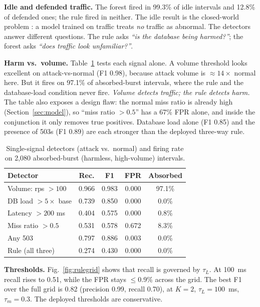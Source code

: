 \documentclass[journal]{IEEEtran}
\begin{document}
\textbf{Idle and defended traffic.} The forest fired in 99.3\% of idle intervals and
12.8\% of defended ones; the rule fired in neither. The idle result is the closed-world
problem \cite{sommer2010}: a model trained on traffic treats \emph{no} traffic as
abnormal. The detectors answer different questions. The rule asks \emph{``is the
database being harmed?''}; the forest asks \emph{``does traffic look unfamiliar?''}.

\textbf{Harm vs.\ volume.} Table~\ref{tab:single} tests each signal alone. A volume
threshold looks excellent on attack-vs-normal (F1 0.98), because attack volume is
${\approx}14\times$ normal here. But it fires on 97.1\% of absorbed-burst intervals,
where the rule and the database-load condition never fire. \emph{Volume detects
traffic; the rule detects harm.} The table also exposes a design flaw: the normal miss
ratio is already high (Section~\ref{sec:model}), so ``miss ratio $>0.5$'' has a 67\%
FPR alone, and inside the conjunction it only removes true positives. Database load
alone (F1 0.85) and the presence of 503s (F1 0.89) are each stronger than the deployed
three-way rule.

\begin{table}[t]
\centering
\caption{Single-signal detectors (attack vs.\ normal) and firing rate on 2{,}080
absorbed-burst (harmless, high-volume) intervals.}
\label{tab:single}
\footnotesize
\setlength{\tabcolsep}{3pt}
\begin{tabular}{@{}lcccc@{}}
\toprule
Detector & Rec. & F1 & FPR & Absorbed \\
\midrule
Volume: rps $>100$ & 0.966 & 0.983 & 0.000 & 97.1\% \\
DB load $>5\times$ base & 0.739 & 0.850 & 0.000 & 0.0\% \\
Latency $>200$ ms & 0.404 & 0.575 & 0.000 & 0.8\% \\
Miss ratio $>0.5$ & 0.531 & 0.578 & 0.672 & 8.3\% \\
Any 503 & 0.797 & 0.886 & 0.003 & 0.0\% \\
Rule (all three) & 0.274 & 0.430 & 0.000 & 0.0\% \\
\bottomrule
\end{tabular}
\end{table}

\textbf{Thresholds.} Fig.~\ref{fig:rulegrid} shows that recall is governed by $\tau_L$.
At 100~ms recall rises to 0.51, while the FPR stays $\le$0.9\% across the grid. The
best F1 over the full grid is 0.82 (precision 0.99, recall 0.70), at $K=2$,
$\tau_L=100$~ms, $\tau_m=0.3$. The deployed thresholds are conservative.
\end{document}
